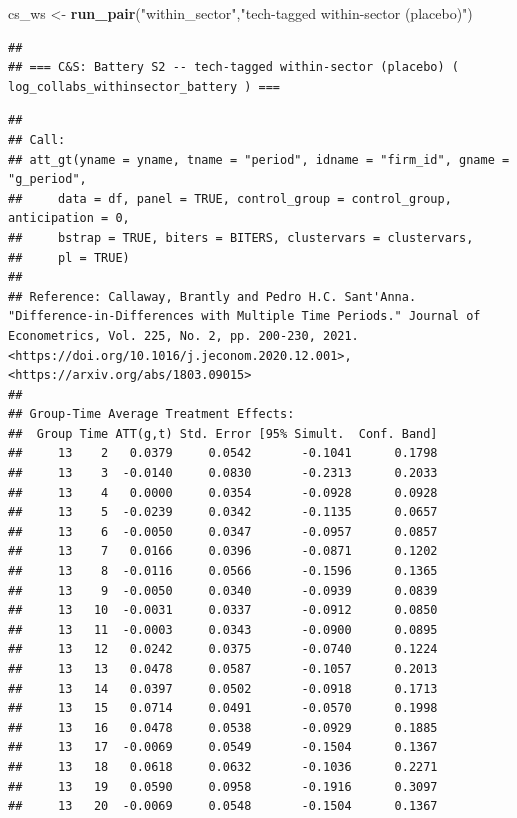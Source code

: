 \documentclass[
]{article}
\newenvironment{Shaded}{\begin{snugshade}}{\end{snugshade}}
\newcommand{\FunctionTok}[1]{\textcolor[rgb]{0.13,0.29,0.53}{\textbf{#1}}}
\newcommand{\NormalTok}[1]{#1}
\newcommand{\OtherTok}[1]{\textcolor[rgb]{0.56,0.35,0.01}{#1}}
\newcommand{\StringTok}[1]{\textcolor[rgb]{0.31,0.60,0.02}{#1}}
\begin{document}
\begin{Shaded}
\begin{Highlighting}[]
\NormalTok{cs\_ws   }\OtherTok{\textless{}{-}} \FunctionTok{run\_pair}\NormalTok{(}\StringTok{"within\_sector"}\NormalTok{,}\StringTok{"tech{-}tagged within{-}sector (placebo)"}\NormalTok{)}
\end{Highlighting}
\end{Shaded}

\begin{verbatim}
## 
## === C&S: Battery S2 -- tech-tagged within-sector (placebo) ( log_collabs_withinsector_battery ) ===
\end{verbatim}

\begin{verbatim}
## 
## Call:
## att_gt(yname = yname, tname = "period", idname = "firm_id", gname = "g_period", 
##     data = df, panel = TRUE, control_group = control_group, anticipation = 0, 
##     bstrap = TRUE, biters = BITERS, clustervars = clustervars, 
##     pl = TRUE)
## 
## Reference: Callaway, Brantly and Pedro H.C. Sant'Anna.  "Difference-in-Differences with Multiple Time Periods." Journal of Econometrics, Vol. 225, No. 2, pp. 200-230, 2021. <https://doi.org/10.1016/j.jeconom.2020.12.001>, <https://arxiv.org/abs/1803.09015> 
## 
## Group-Time Average Treatment Effects:
##  Group Time ATT(g,t) Std. Error [95% Simult.  Conf. Band]  
##     13    2   0.0379     0.0542       -0.1041      0.1798  
##     13    3  -0.0140     0.0830       -0.2313      0.2033  
##     13    4   0.0000     0.0354       -0.0928      0.0928  
##     13    5  -0.0239     0.0342       -0.1135      0.0657  
##     13    6  -0.0050     0.0347       -0.0957      0.0857  
##     13    7   0.0166     0.0396       -0.0871      0.1202  
##     13    8  -0.0116     0.0566       -0.1596      0.1365  
##     13    9  -0.0050     0.0340       -0.0939      0.0839  
##     13   10  -0.0031     0.0337       -0.0912      0.0850  
##     13   11  -0.0003     0.0343       -0.0900      0.0895  
##     13   12   0.0242     0.0375       -0.0740      0.1224  
##     13   13   0.0478     0.0587       -0.1057      0.2013  
##     13   14   0.0397     0.0502       -0.0918      0.1713  
##     13   15   0.0714     0.0491       -0.0570      0.1998  
##     13   16   0.0478     0.0538       -0.0929      0.1885  
##     13   17  -0.0069     0.0549       -0.1504      0.1367  
##     13   18   0.0618     0.0632       -0.1036      0.2271  
##     13   19   0.0590     0.0958       -0.1916      0.3097  
##     13   20  -0.0069     0.0548       -0.1504      0.1367  

\end{verbatim}
\end{document}

